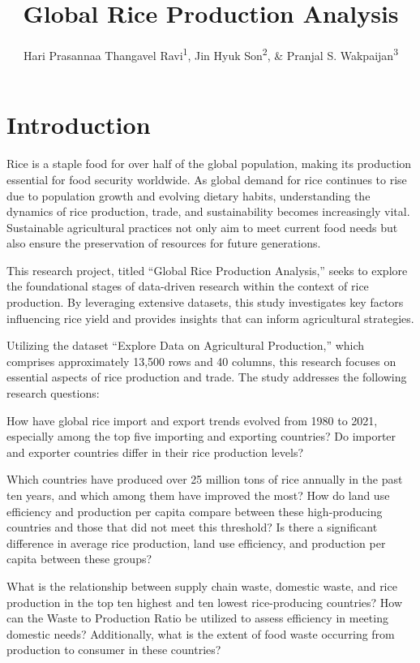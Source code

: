 \documentclass[
  man]{apa6}
\title{Global Rice Production Analysis}
\author{Hari Prasannaa Thangavel Ravi\textsuperscript{1}, Jin Hyuk Son\textsuperscript{2}, \& Pranjal S. Wakpaijan\textsuperscript{3}}
\date{}
\affiliation{\vspace{0.5cm}\textsuperscript{1,2,3} The George Washington University}
\begin{document}
\maketitle

\section{Introduction}\label{introduction}

Rice is a staple food for over half of the global population, making its production essential for food security worldwide. As global demand for rice continues to rise due to population growth and evolving dietary habits, understanding the dynamics of rice production, trade, and sustainability becomes increasingly vital. Sustainable agricultural practices not only aim to meet current food needs but also ensure the preservation of resources for future generations.

This research project, titled ``Global Rice Production Analysis,'' seeks to explore the foundational stages of data-driven research within the context of rice production. By leveraging extensive datasets, this study investigates key factors influencing rice yield and provides insights that can inform agricultural strategies.

Utilizing the dataset ``Explore Data on Agricultural Production,'' which comprises approximately 13,500 rows and 40 columns, this research focuses on essential aspects of rice production and trade. The study addresses the following research questions:

How have global rice import and export trends evolved from 1980 to 2021, especially among the top five importing and exporting countries? Do importer and exporter countries differ in their rice production levels?

Which countries have produced over 25 million tons of rice annually in the past ten years, and which among them have improved the most? How do land use efficiency and production per capita compare between these high-producing countries and those that did not meet this threshold? Is there a significant difference in average rice production, land use efficiency, and production per capita between these groups?

What is the relationship between supply chain waste, domestic waste, and rice production in the top ten highest and ten lowest rice-producing countries? How can the Waste to Production Ratio be utilized to assess efficiency in meeting domestic needs? Additionally, what is the extent of food waste occurring from production to consumer in these countries?
\end{document}
